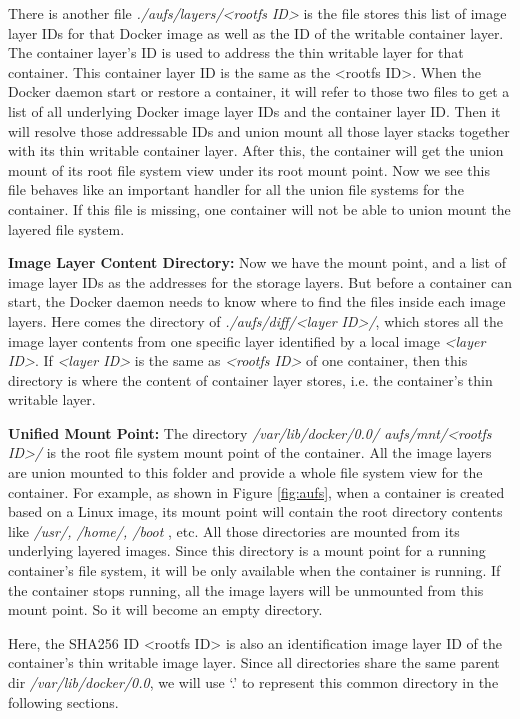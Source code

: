 There is another file \textit{./aufs/layers/<rootfs ID>} is the file stores this list of image layer IDs for that Docker image as well as the ID of the writable container layer.  The container layer's ID is used to address the thin writable layer for that container. This container layer ID is the same as the <rootfs ID>. 
When the Docker daemon start or restore a container, it will refer to those two files to get a list of all underlying Docker image layer IDs and the container layer ID. Then it will resolve those addressable IDs and union mount all those layer stacks together with its thin writable container layer. After this, the container will get the union mount of its root file system view under its root mount point. 
Now we see this file behaves like an important handler for all the union file systems for the container. If this file is missing, one container will not be able to union mount the layered file system.


\textbf{Image Layer Content Directory:} Now we have the mount point, and a list of image layer IDs as the addresses for the storage layers. But before a container can start, the Docker daemon needs to know where to find the files inside each image layers. Here comes the directory of
 \textit{./aufs/diff/<layer ID>/}, which stores all the image layer contents from one specific layer identified by a local image \textit{<layer ID>}. If \textit{<layer ID>} is the same as \textit{<rootfs ID>} of one container, then this directory is where the content of container layer stores, i.e. the container's thin writable layer. 

\textbf{Unified Mount Point:} The directory \textit{/var/lib/docker/0.0/ aufs/mnt/<rootfs ID>/ }  is the root file system mount point of the container. All the image layers are union mounted to this folder and provide a whole file system view for the container. For example, as shown in Figure \ref{fig:aufs}, when a container is created based on a Linux image, its mount point will contain the root directory contents like \textit{/usr/, /home/, /boot }, etc. All those directories are mounted from its underlying layered images. 
Since this directory is a mount point for a running container's file system, it will be only available when the container is running. If the container stops running, all the image layers will be unmounted from this mount point. So it will become an empty directory.

Here, the SHA256 ID <rootfs ID>  is also an identification image layer ID of the container's thin writable image layer. Since all directories share the same parent dir \textit{/var/lib/docker/0.0}, we will use `.' to represent this common directory in the following sections. 

